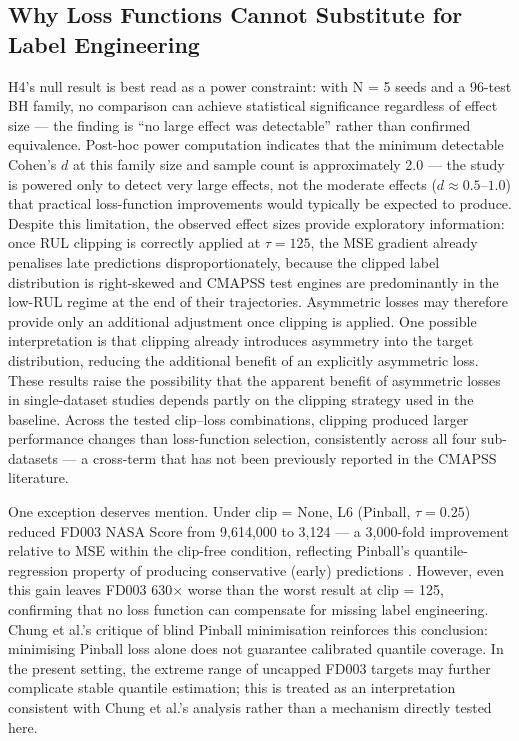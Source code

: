 \documentclass[preprint,10pt]{elsarticle}
\begin{document}
\subsection{Why Loss Functions Cannot Substitute for Label Engineering}

H4's null result is best read as a power constraint: with N = 5 seeds and a 96-test BH family, no comparison can achieve statistical significance regardless of effect size --- the finding is ``no large effect was detectable'' rather than confirmed equivalence. Post-hoc power computation indicates that the minimum detectable Cohen's $d$ at this family size and sample count is approximately 2.0 --- the study is powered only to detect very large effects, not the moderate effects ($d \approx 0.5$--$1.0$) that practical loss-function improvements would typically be expected to produce. Despite this limitation, the observed effect sizes provide exploratory information: once RUL clipping is correctly applied at $\tau = 125$, the MSE gradient already penalises late predictions disproportionately, because the clipped label distribution is right-skewed and CMAPSS test engines are predominantly in the low-RUL regime at the end of their trajectories. Asymmetric losses may therefore provide only an additional adjustment once clipping is applied. One possible interpretation is that clipping already introduces asymmetry into the target distribution, reducing the additional benefit of an explicitly asymmetric loss. These results raise the possibility that the apparent benefit of asymmetric losses in single-dataset studies \cite{ref37,ref38,ref39} depends partly on the clipping strategy used in the baseline. Across the tested clip--loss combinations, clipping produced larger performance changes than loss-function selection, consistently across all four sub-datasets --- a cross-term that has not been previously reported in the CMAPSS literature.

One exception deserves mention. Under clip = None, L6 (Pinball, $\tau = 0.25$) reduced FD003 NASA Score from 9,614,000 to 3,124 — a 3,000-fold improvement relative to MSE within the clip-free condition, reflecting Pinball's quantile-regression property of producing conservative (early) predictions \cite{ref40}. However, even this gain leaves FD003 630× worse than the worst result at clip = 125, confirming that no loss function can compensate for missing label engineering. Chung et al.'s \cite{ref41} critique of blind Pinball minimisation reinforces this conclusion: minimising Pinball loss alone does not guarantee calibrated quantile coverage. In the present setting, the extreme range of uncapped FD003 targets may further complicate stable quantile estimation; this is treated as an interpretation consistent with Chung et al.'s analysis rather than a mechanism directly tested here.
\end{document}
